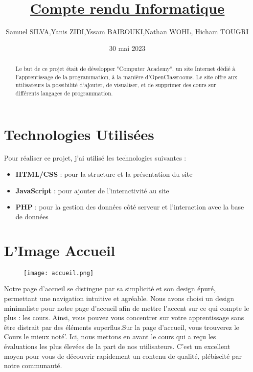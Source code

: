 \documentclass{article}
\title{\textbf{\underline{Compte rendu Informatique}}}
\author{Samuel SILVA,Yanis ZIDI,Yssam BAIROUKI,Nathan WOHL, Hicham TOUGRI}
\date{30 mai 2023}
\begin{document}
\maketitle

\begin{abstract} %
Le but de ce projet était de développer "Computer Academy", un site Internet dédié à l'apprentissage de la programmation, à la manière d'OpenClassrooms. Le site offre aux utilisateurs la possibilité d'ajouter, de visualiser, et de supprimer des cours sur différents langages de programmation.
\end{abstract}

\sectionfont{\underline} %
\subsectionfont{\normalfont} %
\section{Technologies Utilisées}

Pour réaliser ce projet, j'ai utilisé les technologies suivantes :

\begin{itemize}
\item \textbf{HTML/CSS} : pour la structure et la présentation du site
\item \textbf{JavaScript} : pour ajouter de l'interactivité au site
\item \textbf{PHP} : pour la gestion des données côté serveur et l'interaction avec la base de données
\end{itemize}

\section{L'Image Accueil}

\begin{figure}[h]
\centering
\texttt{[image: accueil.png]} 
\end{figure}
Notre page d'accueil se distingue par sa simplicité et son design épuré, permettant une navigation intuitive et agréable.
Nous avons choisi un design minimaliste pour notre page d'accueil afin de mettre l'accent sur ce qui compte le plus : les cours. Ainsi, vous pouvez vous concentrer sur votre apprentissage sans être distrait par des éléments superflus.Sur la page d'accueil, vous trouverez le Cours le mieux noté'. Ici, nous mettons en avant le cours qui a reçu les évaluations les plus élevées de la part de nos utilisateurs. C'est un excellent moyen pour vous de découvrir rapidement un contenu de qualité, plébiscité par notre communauté.
\newpage
\end{document}
